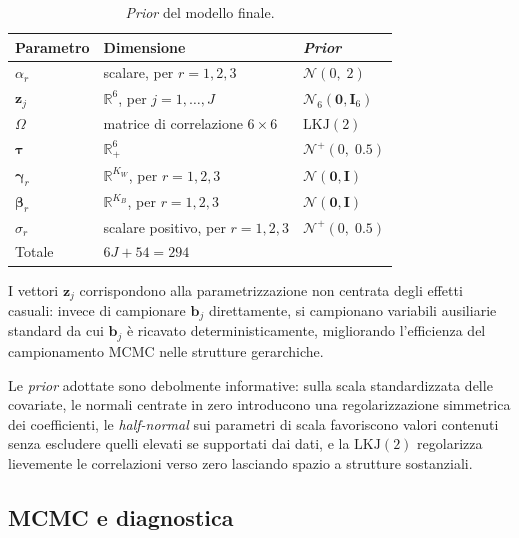 \documentclass[11pt, a4paper]{article}
\newcommand{\Nrm}{\mathcal{N}}
\newcommand{\HN}{\mathcal{N}^{+}}
\begin{document}
\begin{table}[htbp]
\centering
\caption{\textit{Prior} del modello finale.}
\label{tab:prior}
\small
\begin{tabular}{@{}lll@{}}
\toprule
Parametro & Dimensione & \textit{Prior} \\
\midrule
$\alpha_r$
& scalare, per $r=1,2,3$
& $\Nrm(0,\;2)$ \\

$\mathbf{z}_j$
& $\mathbb{R}^6$, per $j=1,\ldots,J$
& $\Nrm_6(\mathbf{0},\mathbf{I}_6)$ \\

$\Omega$
& matrice di correlazione $6\times6$
& $\mathrm{LKJ}(2)$ \\

$\boldsymbol{\tau}$
& $\mathbb{R}^6_{+}$
& $\HN(0,\;0.5)$ \\

$\boldsymbol{\gamma}_r$
& $\mathbb{R}^{K_W}$, per $r=1,2,3$
& $\Nrm(\mathbf{0},\mathbf{I})$ \\

$\boldsymbol{\beta}_r$
& $\mathbb{R}^{K_B}$, per $r=1,2,3$
& $\Nrm(\mathbf{0},\mathbf{I})$ \\

$\sigma_r$
& scalare positivo, per $r=1,2,3$
& $\HN(0,\;0.5)$ \\
\midrule
Totale
& $6J + 54 = 294$
& \\
\bottomrule
\end{tabular}
\end{table}

I vettori $\mathbf{z}_j$ corrispondono alla parametrizzazione non centrata degli effetti casuali: invece di campionare $\mathbf{b}_j$ direttamente, si campionano variabili ausiliarie standard da cui $\mathbf{b}_j$ è ricavato deterministicamente, migliorando l'efficienza del campionamento MCMC nelle strutture gerarchiche.

Le \textit{prior} adottate sono debolmente informative: sulla scala standardizzata delle covariate, le normali centrate in zero introducono una regolarizzazione simmetrica dei coefficienti, le \textit{half-normal} sui parametri di scala favoriscono valori contenuti senza escludere quelli elevati se supportati dai dati, e la $\mathrm{LKJ}(2)$ regolarizza lievemente le correlazioni verso zero lasciando spazio a strutture sostanziali.

\subsection{MCMC e diagnostica}
\end{document}
